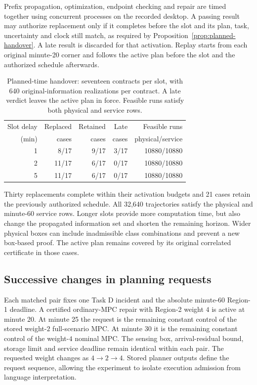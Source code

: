 \documentclass[preprint,12pt]{elsarticle}
\begin{document}
Prefix propagation, optimization, endpoint checking and repair are timed
together using concurrent processes on the recorded desktop. A passing
result may authorize replacement only if it completes before the slot and
its plan, task, uncertainty and clock still match, as required by
Proposition~\ref{prop:planned-handover}. A late result is discarded for that
activation. Replay starts from each original minute-20 corner and follows
the active plan before the slot and the authorized schedule afterwards.

\begin{table}[t]
\centering\small
\caption{Planned-time handover: seventeen contracts per slot, with 640
original-information realizations per contract. A late verdict leaves the
active plan in force. Feasible runs satisfy both physical and service rows.}
\label{supp:detail:tab:delayed-handover}
\begin{tabular}{@{}rrrrr@{}}
\toprule
Slot delay & Replaced & Retained & Late & Feasible runs\\
(min) & cases & cases & cases & physical/service\\
\midrule
1 & 8/17 & 9/17 & 3/17 & 10880/10880\\
2 & 11/17 & 6/17 & 0/17 & 10880/10880\\
5 & 11/17 & 6/17 & 0/17 & 10880/10880\\
\bottomrule
\end{tabular}
\end{table}

Thirty replacements complete within their activation budgets and 21 cases
retain the previously authorized schedule. All 32,640 trajectories satisfy
the physical and minute-60 service rows. Longer slots provide more
computation time, but also change the propagated information set and
shorten the remaining horizon. Wider physical boxes can include
inadmissible class combinations and prevent a new box-based proof. The
active plan remains covered by its original correlated certificate in
those cases.

\subsection{Successive changes in planning requests}
\label{app:sequential-handover}
Each matched pair fixes one Task D incident and the absolute minute-60
Region-1 deadline. A certified ordinary-MPC repair with Region-2 weight
$4$ is active at minute 20. At minute 25 the request is the remaining
constant control of the stored weight-$2$ full-scenario MPC. At minute 30
it is the remaining constant control of the weight-$4$ nominal MPC. The
sensing box, arrival-residual bound, storage limit and service deadline
remain identical within each pair. The requested weight changes as
$4\to2\to4$. Stored planner outputs define the request sequence, allowing
the experiment to isolate execution admission from language interpretation.
\end{document}
